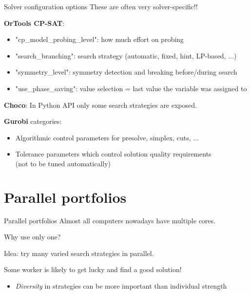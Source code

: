 \documentclass{cons-beamer}
\begin{document}
\begin{frame}{Solver configuration options}
	These are often very solver-specific!!
	\vfill
	
	\textbf{OrTools CP-SAT}: %
\begin{itemize}
	\item "cp\_model\_probing\_level": how much effort on probing
	\item "search\_branching": search strategy (automatic, fixed, hint, LP-based, ...)
	\item "symmetry\_level": symmetry detection and breaking before/during search
	\item "use\_phase\_saving": value selection = last value the variable was assigned to
\end{itemize}
\vfill

\textbf{Choco}: %
In Python API only some search strategies are exposed. 
\vfill

\textbf{Gurobi} categories: %
\begin{itemize}
	\item Algorithmic control parameters for presolve, simplex, cuts, ...
	\item Tolerance parameters which control solution quality requirements \\(not to be tuned automatically)
\end{itemize}
\end{frame}

\section{Parallel portfolios}

\begin{frame}{Parallel portfolios}
	Almost all computers nowadays have multiple cores.
	\vfill
	
	Why use only one?
	\vfill
	\pause
	
	Idea: try many varied search strategies in parallel.
	\vfill
	
	Some worker is likely to get lucky and find a good solution!
	\begin{itemize}
		\item \textit{Diversity} in strategies can be more important than individual strength
	\end{itemize}
\end{frame}
\end{document}
